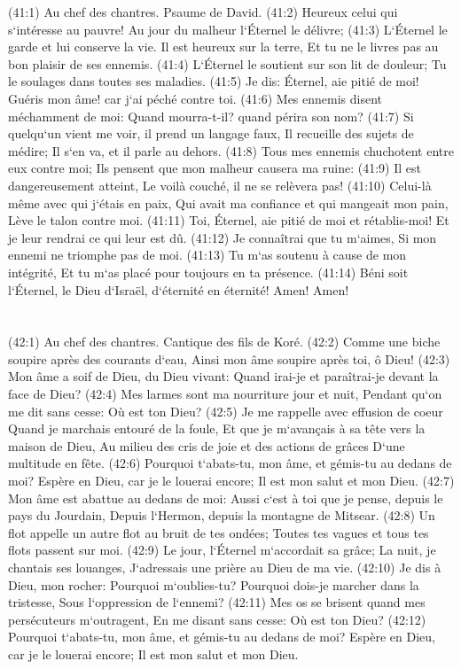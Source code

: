 \verse (41:1) Au chef des chantres. Psaume de David. (41:2) Heureux celui qui s`intéresse au pauvre! Au jour du malheur l`Éternel le délivre; 
\verse (41:3) L`Éternel le garde et lui conserve la vie. Il est heureux sur la terre, Et tu ne le livres pas au bon plaisir de ses ennemis. 
\verse (41:4) L`Éternel le soutient sur son lit de douleur; Tu le soulages dans toutes ses maladies. 
\verse (41:5) Je dis: Éternel, aie pitié de moi! Guéris mon âme! car j`ai péché contre toi. 
\verse (41:6) Mes ennemis disent méchamment de moi: Quand mourra-t-il? quand périra son nom? 
\verse (41:7) Si quelqu`un vient me voir, il prend un langage faux, Il recueille des sujets de médire; Il s`en va, et il parle au dehors. 
\verse (41:8) Tous mes ennemis chuchotent entre eux contre moi; Ils pensent que mon malheur causera ma ruine: 
\verse (41:9) Il est dangereusement atteint, Le voilà couché, il ne se relèvera pas! 
\verse (41:10) Celui-là même avec qui j`étais en paix, Qui avait ma confiance et qui mangeait mon pain, Lève le talon contre moi. 
\verse (41:11) Toi, Éternel, aie pitié de moi et rétablis-moi! Et je leur rendrai ce qui leur est dû. 
\verse (41:12) Je connaîtrai que tu m`aimes, Si mon ennemi ne triomphe pas de moi. 
\verse (41:13) Tu m`as soutenu à cause de mon intégrité, Et tu m`as placé pour toujours en ta présence. 
\verse (41:14) Béni soit l`Éternel, le Dieu d`Israël, d`éternité en éternité! Amen! Amen! 

\chapter{}

\verse (42:1) Au chef des chantres. Cantique des fils de Koré. (42:2) Comme une biche soupire après des courants d`eau, Ainsi mon âme soupire après toi, ô Dieu! 
\verse (42:3) Mon âme a soif de Dieu, du Dieu vivant: Quand irai-je et paraîtrai-je devant la face de Dieu? 
\verse (42:4) Mes larmes sont ma nourriture jour et nuit, Pendant qu`on me dit sans cesse: Où est ton Dieu? 
\verse (42:5) Je me rappelle avec effusion de coeur Quand je marchais entouré de la foule, Et que je m`avançais à sa tête vers la maison de Dieu, Au milieu des cris de joie et des actions de grâces D`une multitude en fête. 
\verse (42:6) Pourquoi t`abats-tu, mon âme, et gémis-tu au dedans de moi? Espère en Dieu, car je le louerai encore; Il est mon salut et mon Dieu. 
\verse (42:7) Mon âme est abattue au dedans de moi: Aussi c`est à toi que je pense, depuis le pays du Jourdain, Depuis l`Hermon, depuis la montagne de Mitsear. 
\verse (42:8) Un flot appelle un autre flot au bruit de tes ondées; Toutes tes vagues et tous tes flots passent sur moi. 
\verse (42:9) Le jour, l`Éternel m`accordait sa grâce; La nuit, je chantais ses louanges, J`adressais une prière au Dieu de ma vie. 
\verse (42:10) Je dis à Dieu, mon rocher: Pourquoi m`oublies-tu? Pourquoi dois-je marcher dans la tristesse, Sous l`oppression de l`ennemi? 
\verse (42:11) Mes os se brisent quand mes persécuteurs m`outragent, En me disant sans cesse: Où est ton Dieu? 
\verse (42:12) Pourquoi t`abats-tu, mon âme, et gémis-tu au dedans de moi? Espère en Dieu, car je le louerai encore; Il est mon salut et mon Dieu. 

